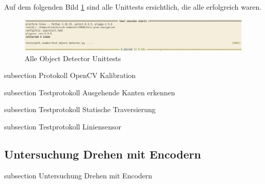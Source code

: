 Auf dem folgenden Bild \ref{img:object_detector_unittests} sind alle Unittests ersichtlich, die alle erfolgreich waren.

\begin{figure}[H]
\centering
\includegraphics[width=\textwidth]{assets/IT/testing/yolo/object-detector-unittests.png}
\caption{Alle Object Detector Unittests}
\label{img:object_detector_unittests}
\end{figure}






{subsection}
{Protokoll OpenCV Kalibration}





{subsection}
{Testprotokoll Ausgehende Kanten erkennen}





{subsection}
{Testprotokoll Statische Traversierung}
\label{statische-traver}




{subsection}
{Testprotokoll Liniensensor}






\newpage
\subsection*{Untersuchung Drehen mit Encodern}\label{drehen-encoder}
    {subsection}
    {Untersuchung Drehen mit Encodern}

